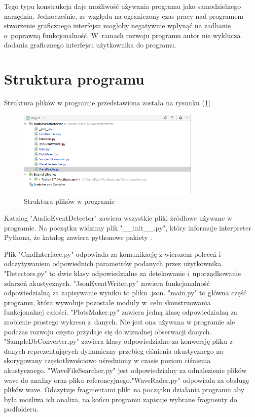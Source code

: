 \documentclass[eng,printmode]{mgr}
\begin{document}
Tego typu konstrukcja daje możliwość używania programu jako samodzielnego narzędzia. Jednocześnie, ze względu na ograniczony czas pracy nad programem stworzenie graficznego interfejsu mogłoby negatywnie wpłynąć na zadbanie o~poprawną funkcjonalność. W~ramach rozwoju programu autor nie wyklucza dodania graficznego interfejsu użytkownika do programu.

\section{Struktura programu}
Struktura plików w programie przedstawiona została na rysunku (\ref{struktura})

\begin{figure}[hbtp]
\label{struktura}
\caption{Struktura plików w programie}
\centering
\includegraphics[width=0.8\textwidth]{struktura.PNG}
\end{figure}

Katalog "AudioEventDetector" zawiera wszystkie pliki źródłowe używane w programie. Na początku widzimy plik "\_\_init\_\_.py", który informuje interpreter Pythona, że 
katalog zawiera pythonowe pakiety \cite{init}. 

Plik "CmdInterface.py" odpowiada za komunikację z wierszem poleceń i odczytywaniem odpowiednich parametrów podanych przez użytkownika. "Detectors.py" to dwie klasy odpowiedzialne za detekowanie i~uporządkowanie zdarzeń akustycznych. "JsonEventWriter.py" zawiera funkcjonalność odpowiedzialną za zapisywanie wyniku to pliku .json. "main.py" to główna część programu, która wywołuje pozostałe moduły w~celu skonstruowania funkcjonalnej całości. "PlotsMaker.py" zawiera jedną klasę odpowiedzialną za zrobienie prostego wykresu z~danych. Nie jest ona używana w programie ale podczas rozwoju często przydaje się do wizualnej obserwacji danych. "SampleDbConverter.py" zawiera klasy odpowiedzialne za konwersję pliku z danych reprezentujących dynamiczny przebieg ciśnienia akustycznego na skorygowany częstotliwościowo uśredniony w czasie poziom ciśnienia akustycznego. "WaveFileSearcher.py" jest odpowiedzialny za odnalezienie plików wave do analizy oraz pliku referencyjnego."WaveRader.py" odpowiada za obsługę plików wave. Odczytuje fragmentami pliki na początku działania programu aby była możliwa ich analiza, na końcu programu zapisuje wybrane fragmenty do podfolderu. 
\end{document}
